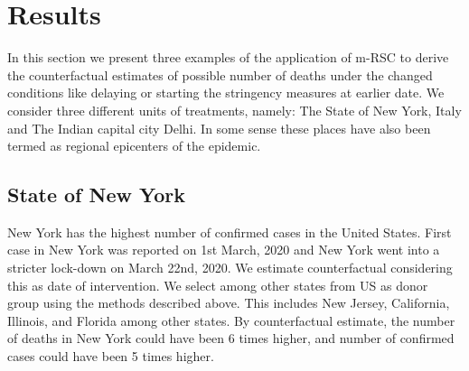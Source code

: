 \documentclass[fleqn,10pt]{wlscirep}
\begin{document}
\section*{Results}
\label{SEC4}
In this section we present three examples of the application of m-RSC to derive the counterfactual estimates of possible number of deaths under the changed conditions like delaying or starting the stringency measures at earlier date. We consider three different units of treatments, namely: The State of New York, Italy and The Indian capital city Delhi. In some sense these places have also been termed as regional epicenters  of the epidemic.

\subsection*{State of New York}
New York has the highest number of confirmed cases in the United States. First case in New York was reported on 1st March, 2020 and New York went into a stricter lock-down on March 22nd, 2020. We estimate counterfactual considering this as date of intervention. We select among other states from US as donor group using the methods described above. This includes New Jersey, California, Illinois, and Florida among other states. By counterfactual estimate, the number of deaths in New York could have been 6 times higher, and number of confirmed cases could have been 5 times higher.
\end{document}

